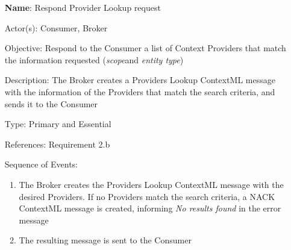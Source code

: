 \begin{itemize}
	\item[\textbf{Name}:] Respond Provider Lookup request
	\item[Actor(s):] Consumer, Broker
	\item[Objective:] Respond to the Consumer a list of Context Providers that match the information requested (\textit{scope}and \textit{entity type})
	\item[Description:] The Broker creates a Providers Lookup ContextML message with the information of the Providers that match the search criteria, and sends it to the Consumer
	\item[Type:] Primary and Essential
	\item[References:] Requirement 2.b 
	\item[Sequence of Events:]\hfill
	\begin{enumerate}
		\item The Broker creates the Providers Lookup ContextML message with the desired Providers. If no Providers match the search criteria, a NACK ContextML message is created, informing \textit{No results found} in the error message
		\item The resulting message is sent to the Consumer
	\end{enumerate}
\end{itemize}

